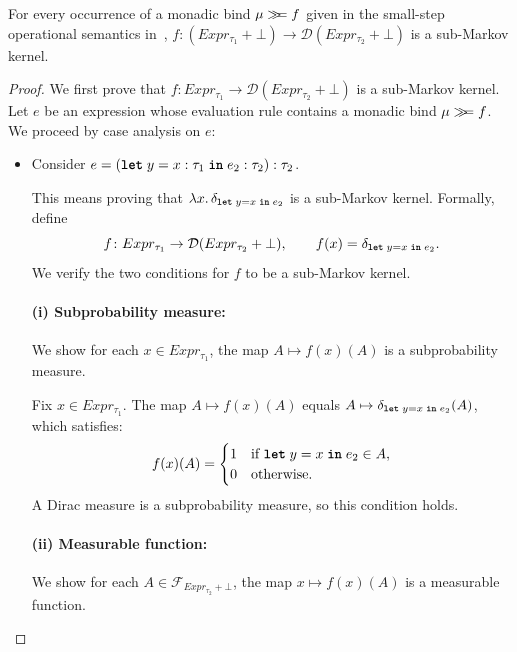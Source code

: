 \begin{lemma}\label{lem:bind-kernel}
	For every occurrence of a monadic bind $\mu \gg\!\!= f$ given in the small-step operational semantics in~, $f : (Expr_{\tau_1} + \bot) \to \mathcal{D}(Expr_{\tau_2} + \bot)$ is a sub-Markov kernel.
\end{lemma}

\begin{proof}
	We first prove that $f : Expr_{\tau_1} \to \mathcal{D}(Expr_{\tau_2} + \bot)$ is a sub-Markov kernel. Let $e$ be an expression whose evaluation rule contains a monadic bind $\mu \gg\!\!= f$. We proceed by case analysis on $e$:

	\begin{itemize}
		\item Consider $e = (\textnormal{\ttfamily\bfseries let}\; y = x : \tau_1 \; \textnormal{\ttfamily\bfseries in}\; e_2 : \tau_2) : \tau_2$. 
		
		This means proving that $\lambda x.\, \delta_{\textnormal{\ttfamily\bfseries let}\; y = x\; \textnormal{\ttfamily\bfseries in}\; e_2}$ is a sub-Markov kernel. Formally, define
		\[
			f \colon Expr_{\tau_1} \to \mathcal{D}(Expr_{\tau_2} + \bot),
			\qquad
			f(x) = \delta_{\textnormal{\ttfamily\bfseries let}\; y = x\; \textnormal{\ttfamily\bfseries in}\; e_2}.
		\]
		We verify the two conditions for $f$ to be a sub-Markov kernel.
	
		\paragraph{(i) Subprobability measure:} We show for each $x \in Expr_{\tau_1}$, the map $A \mapsto f(x)(A)$ is a subprobability measure.
	
		\medskip
	
		Fix $x \in Expr_{\tau_1}$. The map $A \mapsto f(x)(A)$ equals $A \mapsto \delta_{\textnormal{\ttfamily\bfseries let}\; y = x\; \textnormal{\ttfamily\bfseries in}\; e_2}(A)$, which satisfies:
		\[
			f(x)(A) =
			\begin{cases}
				1 & \text{if } \textnormal{\ttfamily\bfseries let}\; y = x\; \textnormal{\ttfamily\bfseries in}\; e_2 \in A, \\
				0 & \text{otherwise.}
			\end{cases}
		\]
		A Dirac measure is a subprobability measure, so this condition holds.
	
		\paragraph{(ii) Measurable function:} 
	
		We show for each $A \in \mathcal{F}_{Expr_{\tau_2} + \bot}$, the map $x \mapsto f(x)(A)$ is a measurable function.
	

\end{itemize}
\end{proof}
